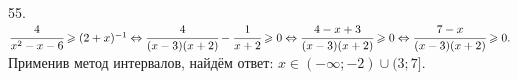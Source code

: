 55. $\cfrac{4}{x^2-x-6}\geqslant(2+x)^{-1}\Leftrightarrow\cfrac{4}{(x-3)(x+2)}-\cfrac{1}{x+2}\geqslant0\Leftrightarrow\cfrac{4-x+3}{(x-3)(x+2)}\geqslant0
\Leftrightarrow\cfrac{7-x}{(x-3)(x+2)}\geqslant0.$ Применив метод интервалов, найдём ответ: $x\in(-\infty;-2)\cup(3;7].$
\begin{figure}[ht!]
\end{figure}\\
